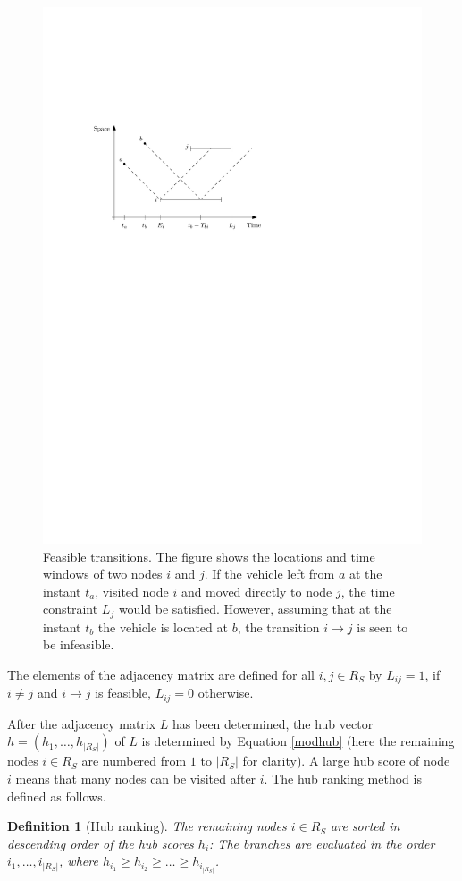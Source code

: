 \documentclass[dissertation,draft*]{aaltoseries}
\newtheorem*{definition}{Definition}
\begin{document}
\begin{figure}[ht]
\begin{center}
\includegraphics[width=0.9\columnwidth]{transitions01.pdf}
\caption{Feasible transitions. The figure shows the 
locations and time windows of two nodes $i$ and $j$.
If the vehicle left from $a$ at the instant $t_a$, visited node $i$
and moved directly to node $j$, the time constraint $L_j$ would be satisfied. 
However, assuming that at the instant $t_b$ the vehicle is located at $b$, the
transition $i \to j$ is seen to be infeasible.
}
\label{transitions01}
\end{center}
\end{figure}
The elements of the adjacency matrix are defined for all $i,j \in R_S$ by 
$L_{ij}= 1$, if $i \neq j$ and $i \to j$ is feasible, $L_{ij} = 0$ otherwise.

After the adjacency matrix $L$ has been determined, the hub vector $h=(h_1,\ldots,h_{|R_S|})$ of $L$ is determined by 
Equation \eqref{modhub} (here the remaining nodes $i \in R_S$ are numbered from $1$ to $|R_S|$ for clarity). 
A large hub score of node $i$ means that many 
nodes can be visited after $i$. 
The hub ranking method is defined as follows.
\begin{definition}[Hub ranking]
The remaining nodes $i \in R_S$ are sorted in descending order of the hub scores $h_i$: 
The branches are evaluated in the order $i_1,\ldots,i_{|R_S|}$, where
$h_{i_1} \geq h_{i_2} \geq \ldots \geq h_{i_{|R_S|}}$.
\end{definition}
\end{document}
